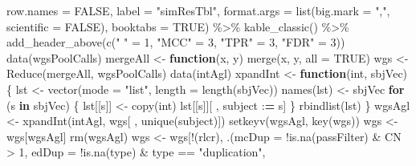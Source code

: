 \documentclass[11pt,letterpaper,oneside]{book}
\newenvironment{Shaded}{\begin{snugshade}}{\end{snugshade}}
\newcommand{\AttributeTok}[1]{\textcolor[rgb]{0.77,0.63,0.00}{#1}}
\newcommand{\ConstantTok}[1]{\textcolor[rgb]{0.00,0.00,0.00}{#1}}
\newcommand{\ControlFlowTok}[1]{\textcolor[rgb]{0.13,0.29,0.53}{\textbf{#1}}}
\newcommand{\DecValTok}[1]{\textcolor[rgb]{0.00,0.00,0.81}{#1}}
\newcommand{\ErrorTok}[1]{\textcolor[rgb]{0.64,0.00,0.00}{\textbf{#1}}}
\newcommand{\FunctionTok}[1]{\textcolor[rgb]{0.00,0.00,0.00}{#1}}
\newcommand{\NormalTok}[1]{#1}
\newcommand{\OtherTok}[1]{\textcolor[rgb]{0.56,0.35,0.01}{#1}}
\newcommand{\SpecialCharTok}[1]{\textcolor[rgb]{0.00,0.00,0.00}{#1}}
\newcommand{\StringTok}[1]{\textcolor[rgb]{0.31,0.60,0.02}{#1}}
\begin{document}
\begin{Shaded}
\begin{Highlighting}[]
      \AttributeTok{row.names =} \ConstantTok{FALSE}\NormalTok{, }
      \AttributeTok{label =} \StringTok{"simResTbl"}\NormalTok{,}
      \AttributeTok{format.args =} \FunctionTok{list}\NormalTok{(}\AttributeTok{big.mark =} \StringTok{","}\NormalTok{, }\AttributeTok{scientific =} \ConstantTok{FALSE}\NormalTok{),}
      \AttributeTok{booktabs =} \ConstantTok{TRUE}\NormalTok{) }\SpecialCharTok{\%\textgreater{}\%}
  \FunctionTok{kable\_classic}\NormalTok{() }\SpecialCharTok{\%\textgreater{}\%}
  \FunctionTok{add\_header\_above}\NormalTok{(}\FunctionTok{c}\NormalTok{(}\StringTok{" "} \OtherTok{=} \DecValTok{1}\NormalTok{, }\StringTok{"MCC"} \OtherTok{=} \DecValTok{3}\NormalTok{, }\StringTok{"TPR"} \OtherTok{=} \DecValTok{3}\NormalTok{, }\StringTok{"FDR"} \OtherTok{=} \DecValTok{3}\NormalTok{))}
\FunctionTok{data}\NormalTok{(wgsPoolCalls)}
\NormalTok{mergeAll }\OtherTok{\textless{}{-}} \ControlFlowTok{function}\NormalTok{(x, y) }\FunctionTok{merge}\NormalTok{(x, y, }\AttributeTok{all =} \ConstantTok{TRUE}\NormalTok{)}
\NormalTok{wgs }\OtherTok{\textless{}{-}} \FunctionTok{Reduce}\NormalTok{(mergeAll, wgsPoolCalls)}
\FunctionTok{data}\NormalTok{(intAgl)}
\NormalTok{xpandInt }\OtherTok{\textless{}{-}} \ControlFlowTok{function}\NormalTok{(int, sbjVec) \{}
\NormalTok{  lst }\OtherTok{\textless{}{-}} \FunctionTok{vector}\NormalTok{(}\AttributeTok{mode =} \StringTok{"list"}\NormalTok{, }\AttributeTok{length =} \FunctionTok{length}\NormalTok{(sbjVec))}
  \FunctionTok{names}\NormalTok{(lst) }\OtherTok{\textless{}{-}}\NormalTok{ sbjVec}
  \ControlFlowTok{for}\NormalTok{ (s }\ControlFlowTok{in}\NormalTok{ sbjVec) \{}
\NormalTok{    lst[[s]] }\OtherTok{\textless{}{-}} \FunctionTok{copy}\NormalTok{(int)}
\NormalTok{    lst[[s]][ , subject }\SpecialCharTok{:}\ErrorTok{=}\NormalTok{ s]}
\NormalTok{  \}}
  \FunctionTok{rbindlist}\NormalTok{(lst)}
\NormalTok{\}}
\NormalTok{wgsAgl }\OtherTok{\textless{}{-}} \FunctionTok{xpandInt}\NormalTok{(intAgl, wgs[ , }\FunctionTok{unique}\NormalTok{(subject)])}
\FunctionTok{setkeyv}\NormalTok{(wgsAgl, }\FunctionTok{key}\NormalTok{(wgs))}
\NormalTok{wgs }\OtherTok{\textless{}{-}}\NormalTok{ wgs[wgsAgl]}
\FunctionTok{rm}\NormalTok{(wgsAgl)}
\NormalTok{wgs }\OtherTok{\textless{}{-}}\NormalTok{ wgs[}\SpecialCharTok{!}\NormalTok{(rlcr),}
\NormalTok{           .(}\AttributeTok{mcDup =} \SpecialCharTok{!}\FunctionTok{is.na}\NormalTok{(passFilter) }\SpecialCharTok{\&}\NormalTok{ CN }\SpecialCharTok{\textgreater{}} \DecValTok{1}\NormalTok{,}
             \AttributeTok{edDup =} \SpecialCharTok{!}\FunctionTok{is.na}\NormalTok{(type) }\SpecialCharTok{\&}\NormalTok{ type }\SpecialCharTok{==} \StringTok{"duplication"}\NormalTok{,}

\end{Highlighting}
\end{Shaded}
\end{document}
